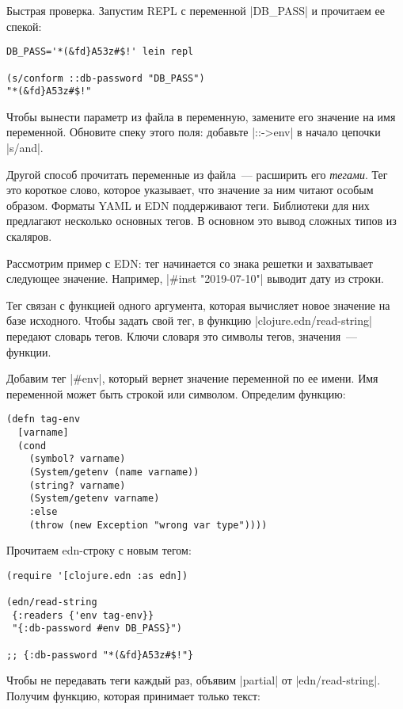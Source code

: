 Быстрая проверка. Запустим REPL с переменной \spverb|DB_PASS| и
прочитаем ее спекой:

\begin{verbatim}
DB_PASS='*(&fd}A53z#$!' lein repl

(s/conform ::db-password "DB_PASS")
"*(&fd}A53z#$!"
\end{verbatim}

Чтобы вынести параметр из файла в переменную, замените его значение на имя
переменной. Обновите спеку этого поля: добавьте \spverb|::->env| в начало
цепочки \spverb|s/and|.

Другой способ прочитать переменные из файла~--- расширить его \emph{тегами}. Тег
это короткое слово, которое указывает, что значение за ним читают особым
образом. Форматы YAML и EDN поддерживают теги. Библиотеки для них предлагают
несколько основных тегов. В основном это вывод сложных типов из скаляров.

Рассмотрим пример с EDN: тег начинается со знака решетки и захватывает следующее
значение. Например, \spverb|#inst "2019-07-10"| выводит дату из строки.

Тег связан с функцией одного аргумента, которая вычисляет новое значение на базе
исходного. Чтобы задать свой тег, в функцию \spverb|clojure.edn/read-string|
передают словарь тегов. Ключи словаря это символы тегов, значения~--- функции.

Добавим тег \spverb|#env|, который вернет значение переменной по ее имени. Имя
переменной может быть строкой или символом. Определим функцию:

\begin{verbatim}
(defn tag-env
  [varname]
  (cond
    (symbol? varname)
    (System/getenv (name varname))
    (string? varname)
    (System/getenv varname)
    :else
    (throw (new Exception "wrong var type"))))
\end{verbatim}

\noindent
Прочитаем edn-строку с новым тегом:

\begin{verbatim}
(require '[clojure.edn :as edn])

(edn/read-string
 {:readers {'env tag-env}}
 "{:db-password #env DB_PASS}")

;; {:db-password "*(&fd}A53z#$!"}
\end{verbatim}

Чтобы не передавать теги каждый раз, объявим \spverb|partial| от
\spverb|edn/read-string|. Получим функцию, которая принимает только текст:

